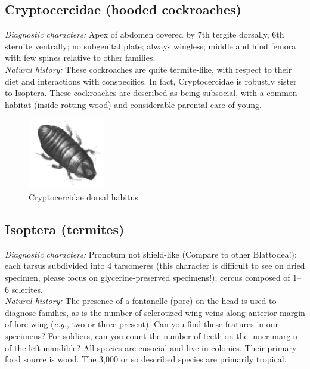 \documentclass[letterpaper, 11pt]{article}
\begin{document}
\subsection{Cryptocercidae (hooded cockroaches)}
\noindent{}\textit{Diagnostic characters:} Apex of abdomen covered by 7th tergite dorsally, 6th sternite ventrally; no subgenital plate; always wingless; middle and hind femora with few spines relative to other families.\\

\noindent{}\textit{Natural history:} These cockroaches are quite termite-like, with respect to their diet and interactions with conspecifics. In fact, Cryptocercidae is robustly sister to Isoptera. These cockroaches are described as being subsocial, with a common habitat (inside rotting wood) and considerable parental care of young. \\

\begin{figure}[ht!]
  \centering
    \includegraphics[width=0.3\textwidth]{CryptocercidHabitus}
  \caption{Cryptocercidae dorsal habitus \citep[][Plate VI, Fig. 20]{bhl18655}}
  \label{fig:cryptocercid}
\end{figure}

\subsection{Isoptera (termites)}
\noindent{}\textit{Diagnostic characters:} Pronotum not shield-like (Compare to other Blattodea!); each tarsus subdivided into 4 tarsomeres (this character is difficult to see on dried specimen, please focus on glycerine-preserved specimens!); cercus composed of 1--6 sclerites.\\

\noindent{}\textit{Natural history:} The presence of a fontanelle (pore) on the head is used to diagnose families, as is the number of sclerotized wing veins along anterior margin of fore wing (\textit{e.g.}, two or three present). Can you find these features in our specimens? For soldiers, can you count the number of teeth on the inner margin of the left mandible? All species are eusocial and live in colonies. Their primary food source is wood. The 3,000 or so described species are primarily tropical.\\
\end{document}
